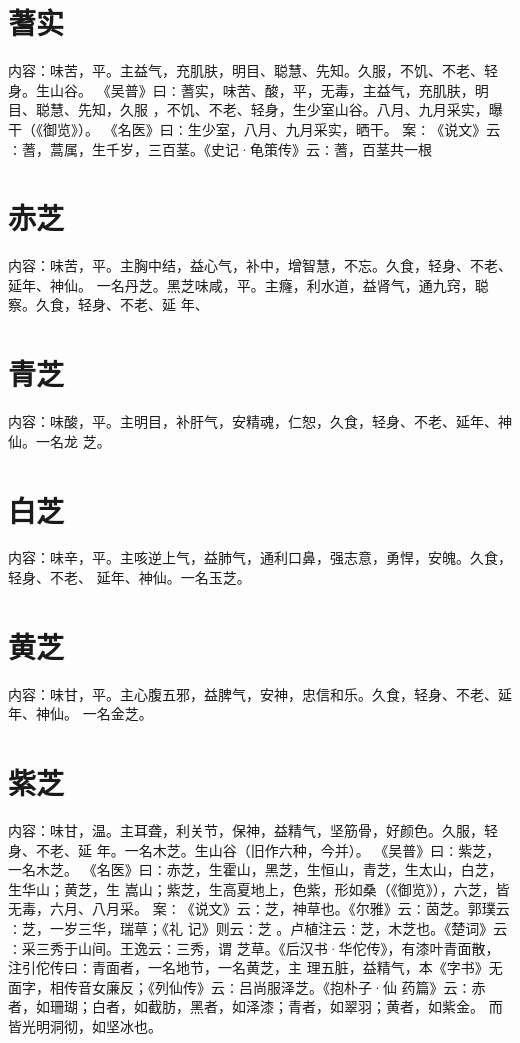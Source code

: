 \documentclass[12pt,UTF8]{ctexbook}
\begin{document}
\section{蓍实}
内容：味苦，平。主益气，充肌肤，明目、聪慧、先知。久服，不饥、不老、轻身。生山谷。 
《吴普》曰∶蓍实，味苦、酸，平，无毒，主益气，充肌肤，明目、聪慧、先知，久服 
，不饥、不老、轻身，生少室山谷。八月、九月采实，曝干（《御览》）。 
《名医》曰∶生少室，八月、九月采实，晒干。 
案∶《说文》云∶蓍，蒿属，生千岁，三百茎。《史记·龟策传》云∶蓍，百茎共一根 


\section{赤芝}
内容：味苦，平。主胸中结，益心气，补中，增智慧，不忘。久食，轻身、不老、延年、神仙。 
一名丹芝。黑芝味咸，平。主癃，利水道，益肾气，通九窍，聪察。久食，轻身、不老、延 
年、 


\section{青芝}
内容：味酸，平。主明目，补肝气，安精魂，仁恕，久食，轻身、不老、延年、神仙。一名龙 
芝。 


\section{白芝}
内容：味辛，平。主咳逆上气，益肺气，通利口鼻，强志意，勇悍，安魄。久食，轻身、不老、 
延年、神仙。一名玉芝。 


\section{黄芝}
内容：味甘，平。主心腹五邪，益脾气，安神，忠信和乐。久食，轻身、不老、延年、神仙。 
一名金芝。 


\section{紫芝}
内容：味甘，温。主耳聋，利关节，保神，益精气，坚筋骨，好颜色。久服，轻身、不老、延 
年。一名木芝。生山谷（旧作六种，今并）。 
《吴普》曰∶紫芝，一名木芝。 
《名医》曰∶赤芝，生霍山，黑芝，生恒山，青芝，生太山，白芝，生华山；黄芝，生 
嵩山；紫芝，生高夏地上，色紫，形如桑（《御览》），六芝，皆无毒，六月、八月采。 
案∶《说文》云∶芝，神草也。《尔雅》云∶茵芝。郭璞云∶芝，一岁三华，瑞草；《礼 
记》则云∶芝 。卢植注云∶芝，木芝也。《楚词》云∶采三秀于山间。王逸云∶三秀，谓 
芝草。《后汉书·华佗传》，有漆叶青面散，注引佗传曰∶青面者，一名地节，一名黄芝，主 
理五脏，益精气，本《字书》无面字，相传音女廉反；《列仙传》云∶吕尚服泽芝。《抱朴子·仙 
药篇》云∶赤者，如珊瑚；白者，如截肪，黑者，如泽漆；青者，如翠羽；黄者，如紫金。 
而皆光明洞彻，如坚冰也。 
\end{document}
